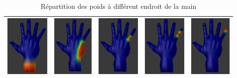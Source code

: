 \paragraph{}
\begin{table}
  \begin{center}
    \begin{tabular}{|c|c|c|c|c|}
      \hline
        \includegraphics[height=3cm]{images/WeightPaintWrist.png} &
       \includegraphics[height=3cm]{images/WeightPaintPinky.png} & 
       \includegraphics[height=3cm]{images/WeightPaintPinkyBase.png} & 
       \includegraphics[height=3cm]{images/WeightPaintPinkyMiddle.png} &
       \includegraphics[height=3cm]{images/WeightPaintPinkyTip.png}\\
       \hline
    \end{tabular}
  \end{center}
  \caption{Répartition des poids à différent endroit de la main}
  \label{tab:repartitionPoid}
\end{table}

